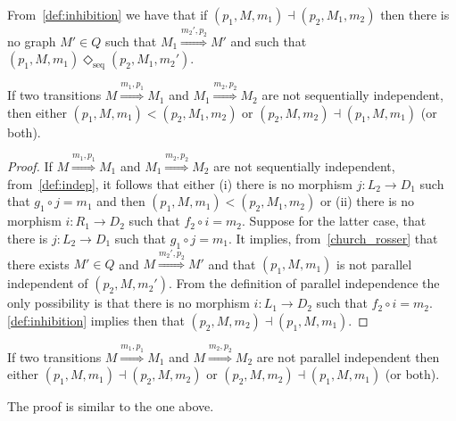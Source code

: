 From~\autoref{def:inhibition} we have that if $(p_1,M,m_1) \dashv (p_2,M_1,m_2)$ then there is no graph $M'\in Q$ such that $M_1\overset{m_2',p_2}{\Rightarrow} M'$ and such that $(p_1,M,m_1)\Diamond_{\text{seq}}(p_2,M_1,m_2')$.

\begin{lemma}
  If two transitions $M\overset{m_1,p_1}{\Rightarrow} M_1$ and $M_1\overset{m_2,p_2}{\Rightarrow} M_2$ are not sequentially independent, then either $(p_1,M,m_1) < (p_2,M_1,m_2)$ or $(p_2,M,m_2)\dashv(p_1,M,m_1)$ (or both).
\end{lemma}
\begin{proof}
  If $M\overset{m_1,p_1}{\Rightarrow} M_1$ and $M_1\overset{m_2,p_2}{\Rightarrow} M_2$ are not sequentially independent, from~\autoref{def:indep}, it follows that either (i) there is no morphism $j:L_2\to D_1$ such that $g_1\circ j= m_1$ and then $(p_1,M,m_1) < (p_2,M_1,m_2)$ or (ii)
there is no morphism $i:R_1\to D_2$ such that $f_2\circ i= m_2$. Suppose for the latter case, that there is $j:L_2\to D_1$ such that $g_1\circ j= m_1$. It implies, from~\autoref{church_rosser} that there exists $M'\in Q$ and $M\overset{m_2',p_2}{\Rightarrow} M'$ and that $(p_1,M,m_1)$ is not parallel independent of $(p_2,M,m_2')$. From the definition of parallel independence the only possibility is that there is no morphism $i:L_1\to D_2$ such that $f_2\circ i= m_2$. \autoref{def:inhibition} implies then that $(p_2,M,m_2)\dashv(p_1,M,m_1)$.
\end{proof}

\begin{lemma}
  If two transitions $M\overset{m_1,p_1}{\Rightarrow} M_1$ and $M\overset{m_2,p_2}{\Rightarrow} M_2$ are not parallel independent then either $(p_1,M,m_1)\dashv(p_2,M,m_2)$ or $(p_2,M,m_2)\dashv(p_1,M,m_1)$ (or both).
\end{lemma}
The proof is similar to the one above.
